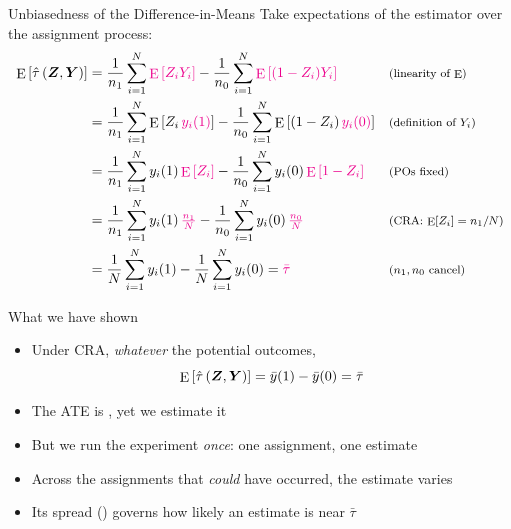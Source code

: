 \documentclass[table, xcolor = {dvipsnames}, 9pt]{beamer}
\theoremstyle{plain}
\newcommand{\mh}[1]{{\color{magenta}{#1}}}
\DeclareMathOperator{\E}{\rm{E}}
\begin{document}
\begin{frame}[t]{Unbiasedness of the Difference-in-Means}
\small
Take expectations of the estimator over the assignment process: \vfill 
\begin{align*}
\E\left[\hat{\tau}\left(\bm{Z}, \bm{Y}\right)\right]
 &= \frac{1}{n_1}\sum_{i=1}^N \mh{\E\left[Z_i Y_i\right]} - \frac{1}{n_0}\sum_{i=1}^N \mh{\E\left[(1 - Z_i) Y_i\right]}
 && \text{\footnotesize (linearity of $\E$)} \\
 &= \frac{1}{n_1}\sum_{i=1}^N \E\left[Z_i\, \mh{y_i(1)}\right] - \frac{1}{n_0}\sum_{i=1}^N \E\left[(1 - Z_i)\, \mh{y_i(0)}\right]
 && \text{\footnotesize (definition of $Y_i$)} \\
 &= \frac{1}{n_1}\sum_{i=1}^N y_i(1)\, \mh{\E\left[Z_i\right]} - \frac{1}{n_0}\sum_{i=1}^N y_i(0)\, \mh{\E\left[1 - Z_i\right]}
 && \text{\footnotesize (POs fixed)} \\
 &= \frac{1}{n_1}\sum_{i=1}^N y_i(1)\, \mh{\tfrac{n_1}{N}} - \frac{1}{n_0}\sum_{i=1}^N y_i(0)\, \mh{\tfrac{n_0}{N}}
 && \text{\footnotesize (CRA: $\E[Z_i] = n_1/N$)} \\
 &= \frac{1}{N}\sum_{i=1}^N y_i(1) - \frac{1}{N}\sum_{i=1}^N y_i(0) = \mh{\bar{\tau}}
 && \text{\footnotesize ($n_1, n_0$ cancel)}
\end{align*}
\vfill
\end{frame}
\begin{frame}[t]{What we have shown}
\vfill
\begin{itemize} \vfill
\item Under CRA, \emph{whatever} the potential outcomes, \vfill
\begin{equation*}
\E\left[\hat{\tau}\left(\bm{Z}, \bm{Y}\right)\right] = \bar{y}(1) - \bar{y}(0) = \bar{\tau}
\end{equation*} \vfill
\item The ATE is \mh{unobservable}, yet we estimate it \mh{without bias} \vfill
\item But we run the experiment \emph{once}: one assignment, one estimate \vfill
\item Across the assignments that \emph{could} have occurred, the estimate varies \vfill
\item Its spread (\mh{variance}) governs how likely an estimate is near $\bar{\tau}$ \vfill
\end{itemize} \vfill
\end{frame}
\end{document}
